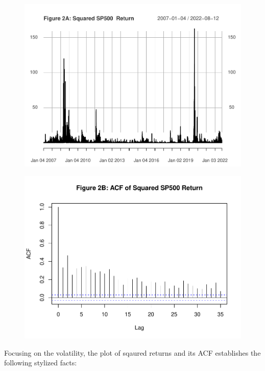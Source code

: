 \documentclass[]{book}
\theoremstyle{definition}
\theoremstyle{definition}
\theoremstyle{definition}
\theoremstyle{remark}
\begin{document}
\begin{figure}

{\centering \includegraphics[width=1\linewidth]{bookdown-demo_files/figure-latex/ch7-figure1-3} 

}

\end{figure}
\begin{figure}

{\centering \includegraphics[width=1\linewidth]{bookdown-demo_files/figure-latex/ch7-figure1-4} 

}

\end{figure}

Focusing on the volatility, the plot of sqaured returns and its ACF
establishes the following stylized facts:
\end{document}
